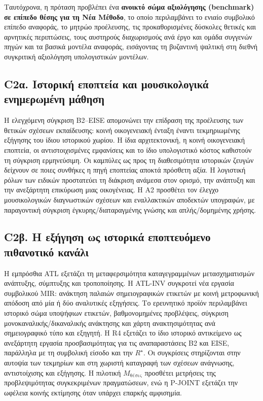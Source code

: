 \documentclass[11pt,a4paper]{article}
\begin{document}
Ταυτόχρονα, η πρόταση προβλέπει ένα \textbf{ανοικτό σώμα αξιολόγησης (benchmark) σε επίπεδο θέσης για τη Νέα Μέθοδο}, το οποίο περιλαμβάνει το ενιαίο συμβολικό επίπεδο αναφοράς, το μητρώο προέλευσης, τις προκαθορισμένες δύσκολες θετικές και αρνητικές περιπτώσεις, τους αυστηρούς διαχωρισμούς ανά έργο και ομάδα συγγενών πηγών και τα βασικά μοντέλα αναφοράς, εισάγοντας τη βυζαντινή ψαλτική στη διεθνή συγκριτική αξιολόγηση υπολογιστικών μοντέλων.

\subsection{C2α. Ιστορική εποπτεία και μουσικολογικά ενημερωμένη μάθηση}
Η ελεγχόμενη σύγκριση B2--EISE απομονώνει την επίδραση της προέλευσης των θετικών σχέσεων εκπαίδευσης: κοινή οικογενειακή ένταξη έναντι τεκμηριωμένης εξήγησης του ίδιου ιστορικού χωρίου. Η ίδια αρχιτεκτονική, η κοινή οικογενειακή εποπτεία, οι αντιστοιχισμένες εμφανίσεις και το ίδιο υπολογιστικό κόστος καθιστούν τη σύγκριση ερμηνεύσιμη. Οι καμπύλες ως προς τη διαθεσιμότητα ιστορικών ζευγών δείχνουν σε ποιες συνθήκες η πηγή εποπτείας αποκτά πρόσθετη αξία. Η λογιστική ρόλων των ειδικών προστατεύει τη διάκριση ανάμεσα στον ορισμό, την ανάπτυξη και την ανεξάρτητη επικύρωση μιας οικογένειας. Η Α2 προσθέτει τον έλεγχο μουσικολογικών διαγνωστικών σχέσεων και εναλλακτικών αποδεκτών υπογραφών, με παραγοντική σύγκριση έγκυρης/διαταραγμένης γνώσης και απλής/δομημένης χρήσης.

\subsection{C2β. Η εξήγηση ως ιστορικά εποπτευόμενο πιθανοτικό κανάλι}
Η εμπρόσθια ATL εξετάζει τη μεταφερσιμότητα καταγεγραμμένων μετασχηματισμών ανάπτυξης, σύμπτυξης και τροποποίησης. Η ATL-INV συγκροτεί νέα εργασία συμβολικού MIR: ανάκτηση παλαιών σημειογραφικών ετικετών με κοινή μετροφωνική απόδοση από μία ή δύο αναλυτικές εξηγήσεις. Το ερευνητικό προϊόν περιλαμβάνει ιστορικό σώμα υποψήφιων ετικετών, βαθμονομημένες προβλέψεις, σύγκριση μονοκαναλικής/δικαναλικής ανάκτησης και χάρτη ανακτησιμότητας ανά σημειογραφικό τύπο και εξηγητή. Η R4 εξετάζει το ίδιο ιστορικό αντικείμενο ως ανεξάρτητη εργασία προσβασιμότητας για τις αναπαραστάσεις B2 και EISE, παράλληλα με τη συμβολική είσοδο και την $R^\star$. Οι συγκρίσεις στηρίζονται στην αυτοψία των τεκμηρίων και στη χωριστή καταγραφή των σχέσεων ανάγνωσης, αντιστοίχισης και εξήγησης. Η πιλοτική $M_{\text{θέσις}}$ προσθέτει μετρήσεις της προβλεψιμότητας συγκεκριμένων πραγματώσεων, ενώ η P-JOINT εξετάζει την ωφέλεια κοινής εκτίμησης όταν υπάρχει επαρκής αμφισημία.
\end{document}
